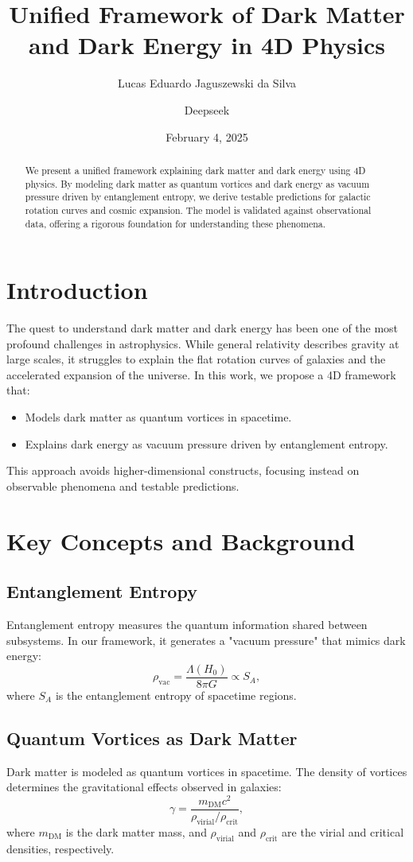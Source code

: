 \documentclass[12pt,a4paper]{article}
\title{Unified Framework of Dark Matter and Dark Energy in 4D Physics}
\author{Lucas Eduardo Jaguszewski da Silva \and Deepseek}
\date{February 4, 2025}
\begin{document}
\maketitle

\begin{abstract}
We present a unified framework explaining dark matter and dark energy using 4D physics. By modeling dark matter as quantum vortices and dark energy as vacuum pressure driven by entanglement entropy, we derive testable predictions for galactic rotation curves and cosmic expansion. The model is validated against observational data, offering a rigorous foundation for understanding these phenomena.
\end{abstract}

\section{Introduction}
The quest to understand dark matter and dark energy has been one of the most profound challenges in astrophysics. While general relativity describes gravity at large scales, it struggles to explain the flat rotation curves of galaxies and the accelerated expansion of the universe. In this work, we propose a 4D framework that:
\begin{itemize}
    \item Models dark matter as quantum vortices in spacetime.
    \item Explains dark energy as vacuum pressure driven by entanglement entropy.
\end{itemize}

This approach avoids higher-dimensional constructs, focusing instead on observable phenomena and testable predictions.

\section{Key Concepts and Background}

\subsection{Entanglement Entropy}
Entanglement entropy measures the quantum information shared between subsystems. In our framework, it generates a "vacuum pressure" that mimics dark energy:
\[
\rho_{\text{vac}} = \frac{\Lambda(H_0)}{8\pi G} \propto S_A,
\]
where $S_A$ is the entanglement entropy of spacetime regions.

\subsection{Quantum Vortices as Dark Matter}
Dark matter is modeled as quantum vortices in spacetime. The density of vortices determines the gravitational effects observed in galaxies:
\[
\gamma = \frac{m_{\text{DM}} c^2}{\rho_{\text{virial}} / \rho_{\text{crit}}},
\]
where $m_{\text{DM}}$ is the dark matter mass, and $\rho_{\text{virial}}$ and $\rho_{\text{crit}}$ are the virial and critical densities, respectively.
\end{document}
